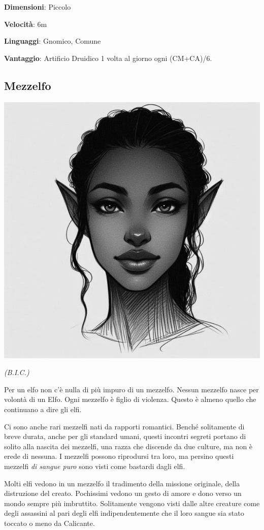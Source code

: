 \begin{multicols}{2}
\textbf{Dimensioni}: Piccolo

\textbf{Velocità}: 6m

\textbf{Linguaggi}: Gnomico, Comune

\textbf{Vantaggio}: Artificio Druidico 1 volta al giorno ogni (CM+CA)/6.


\subsection{Mezzelfo}\label{mezzelfo}


\begin{center}
\includegraphics[height=0.7\linewidth]{immagini/halfelf3_grayscale-ai.png}

\textit{(B.I.C.)}
\end{center}


Per un elfo non c'è nulla di più impuro di un mezzelfo. Nessun mezzelfo nasce per volontà di un Elfo. Ogni mezzelfo è figlio di violenza. Questo è almeno quello che continuano a dire gli elfi.

Ci sono anche rari mezzelfi nati da rapporti romantici. Benché solitamente di breve durata, anche per gli standard umani, questi incontri segreti portano di solito alla nascita dei mezzelfi, una razza che discende da due culture, ma non è erede di nessuna. I mezzelfi possono riprodursi tra loro, ma persino questi mezzelfi \emph{di sangue puro} sono visti come bastardi dagli elfi.

Molti elfi vedono in un mezzelfo il tradimento della missione originale, della distruzione del creato.
Pochissimi vedono un gesto di amore e dono verso un mondo sempre più imbruttito.
Solitamente vengono visti dalle altre creature come degli assassini al pari degli elfi indipendentemente che il loro sangue sia stato toccato o meno da Calicante.


\end{multicols}
